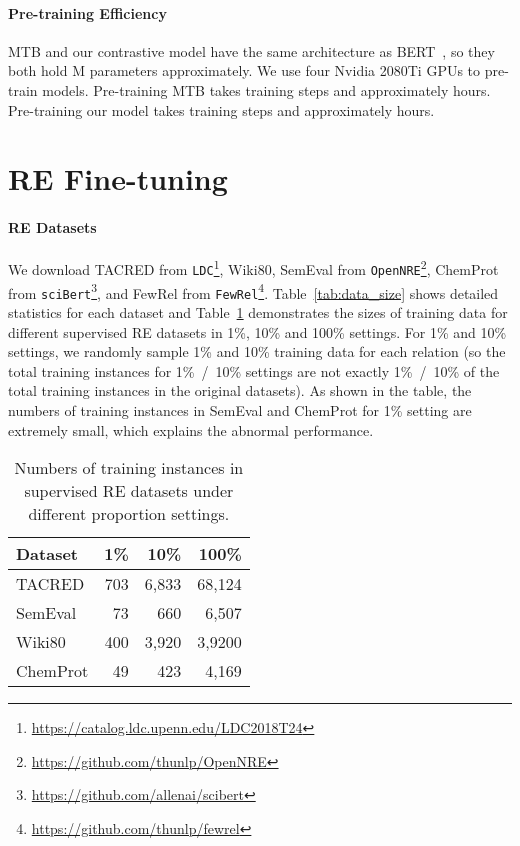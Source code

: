 \documentclass[11pt,a4paper]{article}
\begin{document}
\paragraph{Pre-training Efficiency}  MTB and our contrastive model have the same architecture as BERT~\citep{devlin2019bert}, so they both hold M parameters approximately.
We use four Nvidia 2080Ti GPUs to pre-train models. Pre-training MTB takes  training steps and approximately  hours. Pre-training our model takes  training steps and approximately  hours. 


\section{RE Fine-tuning} 
\label{appendix:fine-tuning}

\paragraph{RE Datasets} We download TACRED from \texttt{LDC}\footnote{\url{https://catalog.ldc.upenn.edu/LDC2018T24}}, Wiki80, SemEval from \texttt{OpenNRE}\footnote{\url{https://github.com/thunlp/OpenNRE}}, ChemProt from \texttt{sciBert}\footnote{\url{https://github.com/allenai/scibert}}, and FewRel from \texttt{FewRel}\footnote{\url{https://github.com/thunlp/fewrel}}. Table~\ref{tab:data_size} shows detailed statistics for each dataset and Table~\ref{tab:data_size_different} demonstrates the sizes of training data for different supervised RE datasets in 1\%, 10\% and 100\% settings. 
For 1\% and 10\% settings, we randomly sample 1\% and 10\% training data for each relation (so the total training instances for 1\%~/~10\% settings are not exactly 1\%~/~10\% of the total training instances in the original datasets). As shown in the table, the numbers of training instances in SemEval and ChemProt for 1\% setting are extremely small, which explains the abnormal performance.




\begin{table}[t]
\small
    \centering
    \begin{tabular}{l|rrr}
        \toprule
        \textbf{Dataset} &  \textbf{1\%} & \textbf{10}\% & \textbf{100}\% \\
        \midrule 
        TACRED & 703 & 6,833& 68,124\\
        SemEval & 73 & 660& 6,507 \\
        Wiki80 & 400 & 3,920& 3,9200 \\
        ChemProt & 49 & 423& 4,169 \\
        \bottomrule
    \end{tabular}
    \caption{Numbers of training instances in supervised RE datasets under different proportion settings.}
    \label{tab:data_size_different}
\end{table}
\end{document}
